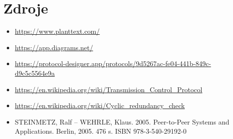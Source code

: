 \documentclass[a4paper,12pt]{article}
\begin{document}
\section{Zdroje}
	\begin{itemize}
	    \item \url{https://www.planttext.com/}
	    \item \url{https://app.diagrams.net/}
	    \item \url{https://protocol-designer.app/protocols/9d5267ac-fe04-441b-849c-d9c5c5564e9a}
	    \item \url{https://en.wikipedia.org/wiki/Transmission_Control_Protocol}
	    \item \url{https://en.wikipedia.org/wiki/Cyclic_redundancy_check}
	    \item STEINMETZ, Ralf – WEHRLE, Klaus. 2005. Peer-to-Peer Systems and Applications. Berlin, 2005. 476 s. ISBN 978-3-540-29192-0
	\end{itemize}
\end{document}

